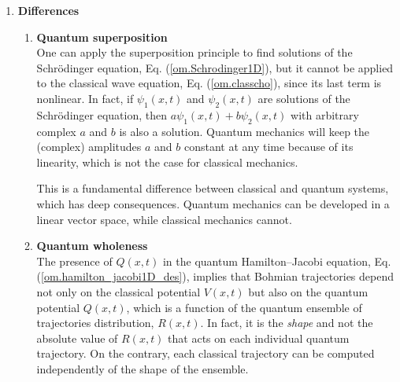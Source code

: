 \documentclass[onecolumn,nofootinbib, secnumarabic, amsmath, nobibnotes,11pt,aps,pra]{revtex4-1}
\newcommand{\eref}[1]{Eq. (\ref{#1})}
\begin{document}
\begin{enumerate}
\item \textbf{Differences}
\begin{enumerate}
\item \textbf{Quantum superposition} \\ One can apply the superposition principle to find solutions of the Schr\"odinger equation, \eref{om.Schrodinger1D}, but it cannot be applied to the classical wave equation, \eref{om.classcho}, since its last term is nonlinear. In fact, if $\psi_1(x,t)$ and $\psi_2(x,t)$ are solutions of the Schr\"odinger equation, then $a\psi_1(x,t) + b\psi_2(x,t)$ with arbitrary complex $a$ and $b$ is also a solution. Quantum mechanics will keep the (complex) amplitudes $a$ and $b$ constant at any time because of its linearity, which is not the case for classical mechanics.

{\quad}This is a fundamental difference between classical and quantum systems, which has deep consequences. Quantum mechanics can be developed in a linear vector space, while classical mechanics cannot.

\item \textbf{Quantum wholeness} \\ The presence of $Q(x,t)$ in the quantum Hamilton--Jacobi equation, \eref{om.hamilton_jacobi1D_des}, implies that Bohmian trajectories depend not only on the classical potential $V(x,t)$ but also on the quantum potential $Q(x,t)$, which is a function of the quantum ensemble of trajectories distribution, $R(x,t)$. In fact, it is the \textit{shape} and not the absolute value of $R(x,t)$ that acts on each individual quantum trajectory. On the contrary, each classical trajectory can be computed independently of the shape of the ensemble.


\end{enumerate}
\end{enumerate}
\end{document}

